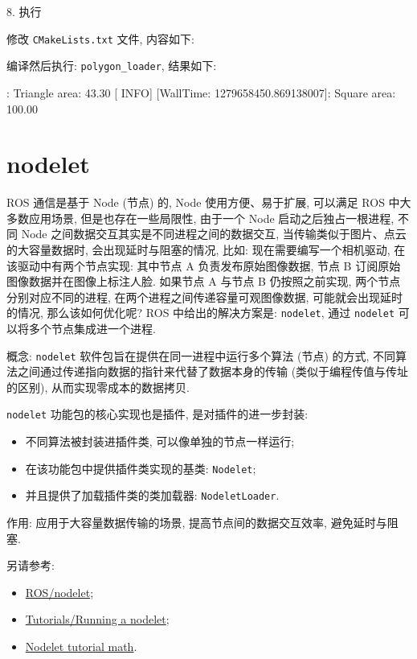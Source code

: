 \documentclass[openany, fontset=windowsold]{ctexbook}
\theoremstyle{kaiti}
\theoremstyle{normal}
\begin{document}
8. 执行

修改 \verb|CMakeLists.txt| 文件, 内容如下:


编译然后执行: \verb|polygon_loader|, 结果如下:

\begin{bash}
  [ INFO] [WallTime: 1279658450.869089666]: Triangle area: 43.30
  [ INFO] [WallTime: 1279658450.869138007]: Square area: 100.00
\end{bash}

\section{nodelet}

ROS 通信是基于 Node (节点) 的, Node 使用方便、易于扩展, 可以满足 ROS 中大多数应用场景, 但是也存在一些局限性, 由于一个 Node 启动之后独占一根进程, 不同 Node 之间数据交互其实是不同进程之间的数据交互, 当传输类似于图片、点云的大容量数据时, 会出现延时与阻塞的情况, 比如: 现在需要编写一个相机驱动, 在该驱动中有两个节点实现: 其中节点 A 负责发布原始图像数据, 节点 B 订阅原始图像数据并在图像上标注人脸. 如果节点 A 与节点 B 仍按照之前实现, 两个节点分别对应不同的进程, 在两个进程之间传递容量可观图像数据, 可能就会出现延时的情况, 那么该如何优化呢? ROS 中给出的解决方案是: \verb|nodelet|, 通过 \verb|nodelet| 可以将多个节点集成进一个进程.

概念: \verb|nodelet| 软件包旨在提供在同一进程中运行多个算法 (节点) 的方式, 不同算法之间通过传递指向数据的指针来代替了数据本身的传输 (类似于编程传值与传址的区别), 从而实现零成本的数据拷贝.

\verb|nodelet| 功能包的核心实现也是插件, 是对插件的进一步封装:

\begin{itemize}
  \item 不同算法被封装进插件类, 可以像单独的节点一样运行; 
  \item 在该功能包中提供插件类实现的基类: \verb|Nodelet|; 
  \item 并且提供了加载插件类的类加载器: \verb|NodeletLoader|.
\end{itemize}

作用: 应用于大容量数据传输的场景, 提高节点间的数据交互效率, 避免延时与阻塞.

另请参考:

\begin{itemize}
  \item \href{http://wiki.ros.org/nodelet/}{ROS/nodelet};
  \item \href{http://wiki.ros.org/nodelet/Tutorials/Running%20a%20nodelet}{Tutorials/Running a nodelet};
  \item \href{https://github.com/ros/common_tutorials/tree/noetic-devel/nodelet_tutorial_math}{Nodelet tutorial math}.
\end{itemize}
\end{document}
